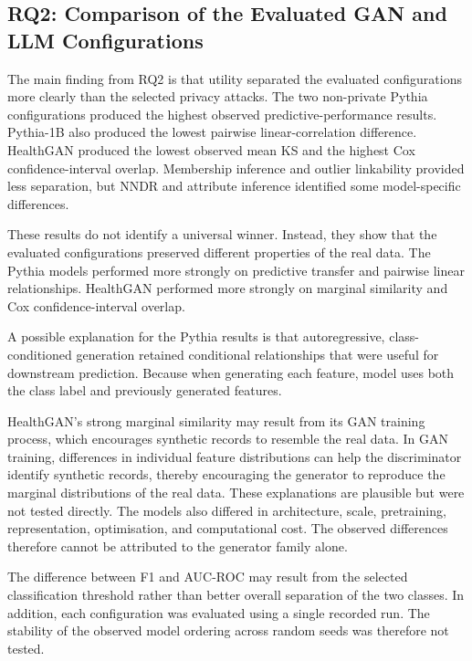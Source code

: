 \subsection{RQ2: Comparison of the Evaluated GAN and LLM Configurations}

The main finding from RQ2 is that utility separated the evaluated
configurations more clearly than the selected privacy attacks. The two
non-private Pythia configurations produced the highest observed
predictive-performance results. Pythia-1B also produced the lowest
pairwise linear-correlation difference. HealthGAN produced the lowest
observed mean KS and the highest Cox confidence-interval overlap.
Membership inference and outlier linkability provided less separation,
but NNDR and attribute inference identified some model-specific
differences.

These results do not identify a universal winner. Instead, they show
that the evaluated configurations preserved different properties of the
real data. The Pythia models performed more strongly on predictive
transfer and pairwise linear relationships. HealthGAN performed more
strongly on marginal similarity and Cox confidence-interval overlap.

A possible explanation for the Pythia results is that autoregressive,
class-conditioned generation retained conditional relationships that
were useful for downstream prediction. Because when generating each feature,
model uses both the class label and previously generated features.

HealthGAN's strong marginal  similarity may result from its GAN training
process, which encourages synthetic records to resemble the real data. In GAN training, 
differences in individual feature
distributions can help the discriminator identify synthetic records,
thereby encouraging the generator to reproduce the marginal
distributions of the real data. These explanations are plausible 
but were not tested directly. The
models also differed in architecture, scale, pretraining, representation,
optimisation, and computational cost. The observed differences therefore
cannot be attributed to the generator family alone.

The difference between F1 and AUC-ROC may result from the selected
classification threshold rather than better overall separation of the
two classes. In addition, each configuration was evaluated using a single recorded
run. The stability of the observed model ordering across random seeds was
therefore not tested.

